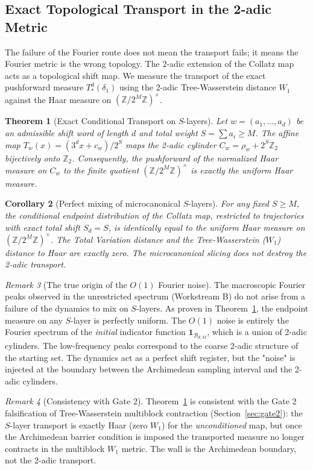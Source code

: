 \documentclass[12pt,a4paper]{article}
\newtheorem{theorem}{Theorem}[section]
\newtheorem{corollary}[theorem]{Corollary}
\theoremstyle{remark}
\newtheorem{remark}[theorem]{Remark}
\begin{document}
\subsection{Exact Topological Transport in the 2-adic Metric}
The failure of the Fourier route does not mean the transport fails; it means the Fourier metric is the wrong topology. The 2-adic extension of the Collatz map acts as a topological shift map. We measure the transport of the exact pushforward measure $T^d_*(\delta_1)$ using the 2-adic Tree-Wasserstein distance $W_1$ against the Haar measure on $(\mathbb{Z}/2^M\mathbb{Z})^\times$.
\begin{theorem}[Exact Conditional Transport on $S$-layers]
\label{thm:exact_conditional_transport}
Let $w = (a_1, \ldots, a_d)$ be an admissible shift word of length $d$ and total weight $S = \sum a_i \ge M$. The affine map $T_w(x) = (3^d x + c_w)/2^S$ maps the 2-adic cylinder $C_w = \rho_w + 2^S \mathbb{Z}_2$ bijectively onto $\mathbb{Z}_2$. Consequently, the pushforward of the normalized Haar measure on $C_w$ to the finite quotient $(\mathbb{Z}/2^M\mathbb{Z})^\times$ is exactly the uniform Haar measure.
\end{theorem}
\begin{corollary}[Perfect mixing of microcanonical $S$-layers]
For any fixed $S \ge M$, the conditional endpoint distribution of the Collatz map, restricted to trajectories with exact total shift $S_d = S$, is identically equal to the uniform Haar measure on $(\mathbb{Z}/2^M\mathbb{Z})^\times$. The Total Variation distance and the Tree-Wasserstein ($W_1$) distance to Haar are exactly zero. The microcanonical slicing does not destroy the 2-adic transport.
\end{corollary}
\begin{remark}[The true origin of the $O(1)$ Fourier noise]
The macroscopic Fourier peaks observed in the unrestricted spectrum (Workstream B) do not arise from a failure of the dynamics to mix on $S$-layers. As proven in Theorem~\ref{thm:exact_conditional_transport}, the endpoint measure on any $S$-layer is perfectly uniform. The $O(1)$ noise is entirely the Fourier spectrum of the \emph{initial} indicator function $\mathbf{1}_{\mathcal{B}_{d,M}}$, which is a union of 2-adic cylinders. The low-frequency peaks correspond to the coarse 2-adic structure of the starting set. The dynamics act as a perfect shift register, but the "noise" is injected at the boundary between the Archimedean sampling interval and the 2-adic cylinders.
\end{remark}
\begin{remark}[Consistency with Gate 2]
Theorem~\ref{thm:exact_conditional_transport} is consistent with the Gate 2
falsification of Tree-Wasserstein multiblock contraction
(Section~\ref{sec:gate2}): the $S$-layer transport is exactly Haar (zero $W_1$)
for the \emph{unconditioned} map, but once the Archimedean barrier condition is
imposed the transported measure no longer contracts in the multiblock $W_1$
metric. The wall is the Archimedean boundary, not the $2$-adic transport.
\end{remark}
\end{document}
